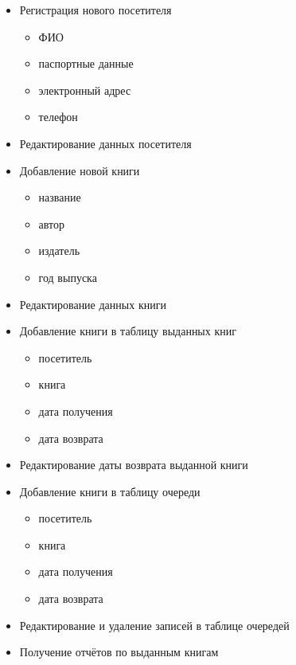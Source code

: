 \documentclass[a4paper,10pt]{article}
\begin{document}
            \begin{itemize}
                \item Регистрация нового посетителя
                    \begin{itemize}
                        \item ФИО
                        \item паспортные данные
                        \item электронный адрес
                        \item телефон
                    \end{itemize}
                \item Редактирование данных посетителя
                \item Добавление новой книги
                    \begin{itemize}
                        \item название
                        \item автор
                        \item издатель
                        \item год выпуска
                    \end{itemize}
                \item Редактирование данных книги
                \item Добавление книги в таблицу выданных книг
                    \begin{itemize}
                        \item посетитель
                        \item книга
                        \item дата получения 
                        \item дата возврата
                    \end{itemize}
                \item Редактирование даты возврата выданной книги
                \item Добавление книги в таблицу очереди
                    \begin{itemize}
                        \item посетитель
                        \item книга
                        \item дата получения 
                        \item дата возврата
                    \end{itemize}
                \item Редактирование и удаление записей в таблице очередей
                \item Получение отчётов по выданным книгам
            \end{itemize}
\end{document}
